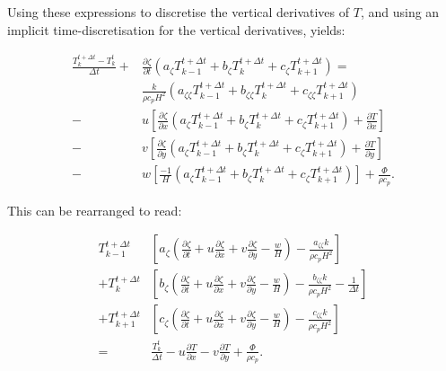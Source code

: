 \documentclass{article}
\begin{document}
Using these expressions to discretise the vertical derivatives of $T$, and using an implicit time-discretisation for the vertical derivatives, yields:

\begin{equation}
\begin{split}
\frac{T_k^{t + \Delta t} - T_k^t}{\Delta t} + & \frac{\partial \zeta}{\partial t} 
\left( a_{\zeta} T_{k-1}^{t+\Delta t} + b_{\zeta} T_k^{t+\Delta t} + c_{\zeta} T_{k+1}^{t+\Delta t} \right) = \\
& \frac{k}{\rho c_p H^2} \left( a_{\zeta \zeta} T_{k-1}^{t+\Delta t} + b_{\zeta \zeta} T_k^{t+\Delta t} + c_{\zeta \zeta} T_{k+1}^{t+\Delta t} \right) \\
- & u \left[ \frac{\partial \zeta}{\partial x} \left( a_{\zeta} T_{k-1}^{t+\Delta t} + b_{\zeta} T_k^{t+\Delta t} + c_{\zeta} T_{k+1}^{t+\Delta t} \right) + \frac{\partial T}{\partial x} \right] \\
- & v \left[ \frac{\partial \zeta}{\partial y} \left( a_{\zeta} T_{k-1}^{t+\Delta t} + b_{\zeta} T_k^{t+\Delta t} + c_{\zeta} T_{k+1}^{t+\Delta t} \right) + \frac{\partial T}{\partial y} \right] \\
- & w \left[ \frac{-1}{H} \left( a_{\zeta} T_{k-1}^{t+\Delta t} + b_{\zeta} T_k^{t+\Delta t} + c_{\zeta} T_{k+1}^{t+\Delta t} \right) \right]
+ \frac{\Phi}{\rho c_p}.
\end{split}
\end{equation}

This can be rearranged to read:

\begin{equation}
\begin{split}
T_{k-1}^{t+\Delta t} & \left[ a_{\zeta} \left( \frac{\partial \zeta}{\partial t} + u \frac{\partial \zeta}{\partial x} + v \frac{\partial \zeta}{\partial y} - \frac{w}{H} \right) - \frac{a_{\zeta \zeta} k}{\rho c_p H^2} \right] \\
+ T_k^{t+\Delta t} & \left[ b_{\zeta} \left( \frac{\partial \zeta}{\partial t} + u \frac{\partial \zeta}{\partial x} + v \frac{\partial \zeta}{\partial y} - \frac{w}{H} \right) - \frac{b_{\zeta \zeta} k}{\rho c_p H^2} - \frac{1}{\Delta t} \right] \\
+ T_{k+1}^{t+\Delta t} & \left[ c_{\zeta} \left( \frac{\partial \zeta}{\partial t} + u \frac{\partial \zeta}{\partial x} + v \frac{\partial \zeta}{\partial y} - \frac{w}{H} \right) - \frac{c_{\zeta \zeta} k}{\rho c_p H^2} \right] \\
= & \frac{T_k^t}{\Delta t} - u \frac{\partial T}{\partial x} - v \frac{\partial T}{\partial y} + \frac{\Phi}{\rho c_p}.
\end{split}
\end{equation}
\end{document}
